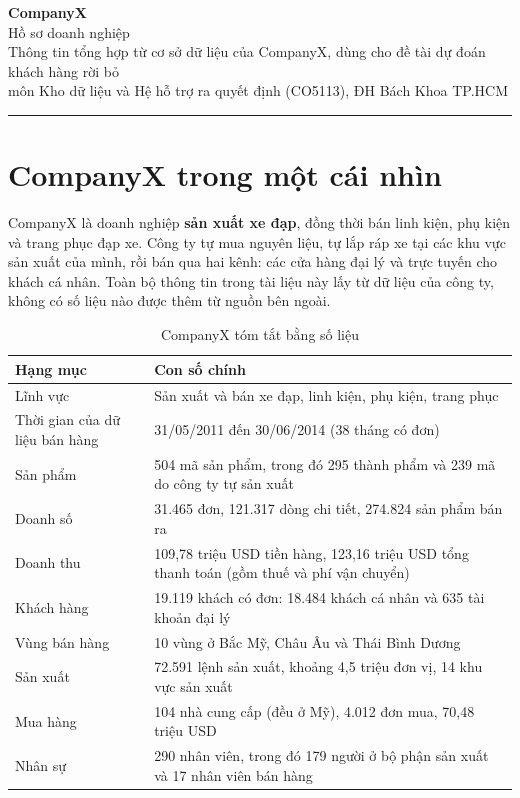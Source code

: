 \documentclass[11pt,a4paper]{article}
\begin{document}
\begin{center}
{\fontsize{26}{30}\selectfont\bfseries\color{navy} CompanyX}\\[6pt]
{\Large Hồ sơ doanh nghiệp}\\[4pt]
{\small Thông tin tổng hợp từ cơ sở dữ liệu của CompanyX, dùng cho đề tài dự đoán khách hàng rời bỏ\\ môn Kho dữ liệu và Hệ hỗ trợ ra quyết định (CO5113), ĐH Bách Khoa TP.HCM}
\end{center}
\vspace{4pt}
\hrule
\vspace{8pt}

\section{CompanyX trong một cái nhìn}
CompanyX là doanh nghiệp \textbf{sản xuất xe đạp}, đồng thời bán linh kiện, phụ kiện và trang phục đạp xe. Công ty tự mua nguyên liệu, tự lắp ráp xe tại các khu vực sản xuất của mình, rồi bán qua hai kênh: các cửa hàng đại lý và trực tuyến cho khách cá nhân. Toàn bộ thông tin trong tài liệu này lấy từ dữ liệu của công ty, không có số liệu nào được thêm từ nguồn bên ngoài.

\begin{table}[H]
\centering
\small
\begin{tabular}{p{4.2cm}p{11.2cm}}
\toprule
Hạng mục & Con số chính \\
\midrule
Lĩnh vực & Sản xuất và bán xe đạp, linh kiện, phụ kiện, trang phục \\
Thời gian của dữ liệu bán hàng & 31/05/2011 đến 30/06/2014 (38 tháng có đơn) \\
Sản phẩm & 504 mã sản phẩm, trong đó 295 thành phẩm và 239 mã do công ty tự sản xuất \\
Doanh số & 31.465 đơn, 121.317 dòng chi tiết, 274.824 sản phẩm bán ra \\
Doanh thu & 109,78 triệu USD tiền hàng, 123,16 triệu USD tổng thanh toán (gồm thuế và phí vận chuyển) \\
Khách hàng & 19.119 khách có đơn: 18.484 khách cá nhân và 635 tài khoản đại lý \\
Vùng bán hàng & 10 vùng ở Bắc Mỹ, Châu Âu và Thái Bình Dương \\
Sản xuất & 72.591 lệnh sản xuất, khoảng 4,5 triệu đơn vị, 14 khu vực sản xuất \\
Mua hàng & 104 nhà cung cấp (đều ở Mỹ), 4.012 đơn mua, 70,48 triệu USD \\
Nhân sự & 290 nhân viên, trong đó 179 người ở bộ phận sản xuất và 17 nhân viên bán hàng \\
\bottomrule
\end{tabular}
\caption{CompanyX tóm tắt bằng số liệu}
\end{table}
\end{document}
